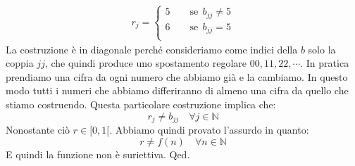 {\begin{align*}
	r_{j} = 
	\begin{cases}
		5 \qquad \mathrm{se}\;\,b_{jj} \neq 5\\
		6 \qquad \mathrm{se}\;\,b_{jj} = 5\\
	\end{cases}
\end{align*}
La costruzione è in diagonale perché consideriamo come indici della $b$ solo la coppia $jj$, che quindi produce uno spostamento regolare $00, 11, 22, \cdots$. In pratica prendiamo una cifra da ogni numero che abbiamo già e la cambiamo. In questo modo tutti i numeri che abbiamo differiranno di almeno una cifra da quello che stiamo costruendo. Questa particolare costruzione implica che:
\begin{equation*}
	r_j \neq b_{jj} \quad \forall j \in \mathbb{N}
\end{equation*}
Nonostante ciò $r \in [0,1[$. Abbiamo quindi provato l'assurdo in quanto:
\begin{equation*}
	r \neq f(n) \quad \forall n \in \mathbb{N}
\end{equation*}
E quindi la funzione non è suriettiva.
\hfill Qed.

}
